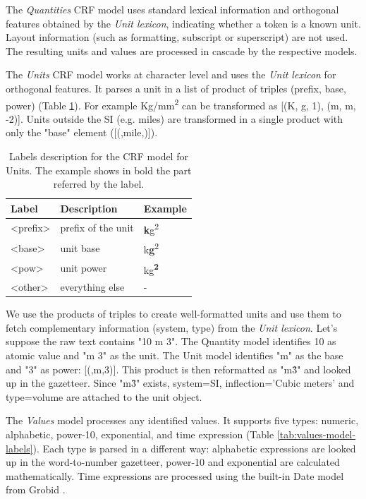 \documentclass[sigplan, anonymous, review]{acmart}
\begin{document}
The \textit{Quantities} CRF model uses standard lexical information and orthogonal features obtained by the \textit{Unit lexicon}, indicating  whether a token is a known unit. Layout information (such as formatting, subscript or superscript) are not used. The resulting units and values are processed in cascade by the respective models. 

The \textit{Units} CRF model works at character level and uses the \textit{Unit lexicon} for orthogonal features. It parses a unit in a list of product of triples (prefix, base, power) (Table \ref{tab:units-model-labels}). For example Kg/mm\textsuperscript{2} can be transformed as [(K, g, 1), (m, m, -2)]. Units outside the SI (e.g. miles) are transformed in a single product with only the "base" element ([(,mile,)]). 

\begin{table}[ht]
  \caption{Labels description for the CRF model for Units. The example shows in bold the part referred by the label. }
  \label{tab:units-model-labels}
  \begin{tabular}{lll}
    \toprule
    Label & Description & Example\\
    \midrule
    <prefix> & prefix of the unit  & \textbf{k}g\textsuperscript{2} \\
    <base> & unit base & k\textbf{g}\textsuperscript{2}\\
    <pow> & unit power & kg\textsuperscript{\textbf{2}}\\
    <other> & everything else & - \\
  \bottomrule
\end{tabular}
\end{table}

We use the products of triples to create well-formatted units and use them to fetch complementary information (system, type) from the \textit{Unit lexicon}. Let's suppose the raw text contains "10 m 3". The Quantity model identifies 10 as atomic value and "m 3" as the unit. The Unit model identifies "m" as the base and "3" as power: [(,m,3)]. This product is then reformatted as "m\^3" and looked up in the gazetteer. Since "m\^3" exists, system=SI, inflection='Cubic meters' and type=volume are attached to the unit object. 

The \textit{Values} model processes any identified values. It supports five types: numeric, alphabetic, power-10, exponential, and time expression (Table \ref{tab:values-model-labels}). Each type is parsed in a different way: alphabetic expressions are looked up in the word-to-number gazetteer, power-10 and exponential are calculated mathematically. Time expressions are processed using the built-in Date model from Grobid \cite{GROBID}.
\end{document}

